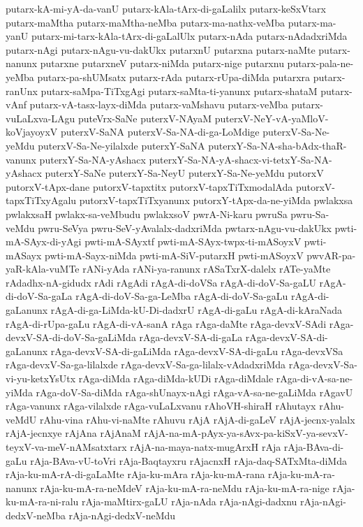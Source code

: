 {putarx-kA-mi-yA-da-vanU
putarx-kAla-tArx-di-gaLalilx
putarx-keSxVtarx
putarx-maMtha
putarx-maMtha-neMba
putarx-ma-nathx-veMba
putarx-ma-yanU
putarx-mi-tarx-kAla-tArx-di-gaLalUlx
putarx-nAda
putarx-nAdadxriMda
putarx-nAgi
putarx-nAgu-vu-dakUkx
putarxnU
putarxna
putarx-naMte
putarx-nanunx
putarxne
putarxneV
putarx-niMda
putarx-nige
putarxnu
putarx-pala-ne-yeMba
putarx-pa-shUMsatx
putarx-rAda
putarx-rUpa-diMda
putarxra
putarx-ranUnx
putarx-saMpa-TiTxgAgi
putarx-saMta-ti-yanunx
putarx-shataM
putarx-vAnf
putarx-vA-tasx-layx-diMda
putarx-vaMshavu
putarx-veMba
putarx-vuLaLxva-LAgu
puteVrx-SaNe
puterxV-NAyaM
puterxV-NeY-vA-yaMloV-koVjayoyxV
puterxV-SaNA
puterxV-Sa-NA-di-ga-LoMdige
puterxV-Sa-Ne-yeMdu
puterxV-Sa-Ne-yilalxde
puterxY-SaNA
puterxY-Sa-NA-sha-bAdx-thaR-vanunx
puterxY-Sa-NA-yAshacx
puterxY-Sa-NA-yA-shacx-vi-tetxY-Sa-NA-yAshacx
puterxY-SaNe
puterxY-Sa-NeyU
puterxY-Sa-Ne-yeMdu
putorxV
putorxV-tApx-dane
putorxV-tapxtitx
putorxV-tapxTiTxmodalAda
putorxV-tapxTiTxyAgalu
putorxV-tapxTiTxyanunx
putorxY-tApx-da-ne-yiMda
pwlakxsa
pwlakxsaH
pwlakx-sa-veMbudu
pwlakxsoV
pwrA-Ni-karu
pwruSa
pwru-Sa-veMdu
pwru-SeVya
pwru-SeV-yAvalalx-dadxriMda
pwtarx-nAgu-vu-dakUkx
pwti-mA-SAyx-di-yAgi
pwti-mA-SAyxtf
pwti-mA-SAyx-twpx-ti-mASoyxV
pwti-mASayx
pwti-mA-Sayx-niMda
pwti-mA-SiV-putarxH
pwti-mASoyxV
pwvAR-pa-yaR-kAla-vuMTe
rANi-yAda
rANi-ya-ranunx
rASaTxrX-dalelx
rATe-yaMte
rAdadhx-nA-gidudx
rAdi
rAgAdi
rAgA-di-doVSa
rAgA-di-doV-Sa-gaLU
rAgA-di-doV-Sa-gaLa
rAgA-di-doV-Sa-ga-LeMba
rAgA-di-doV-Sa-gaLu
rAgA-di-gaLanunx
rAgA-di-ga-LiMda-kU-Di-dadxrU
rAgA-di-gaLu
rAgA-di-kAraNada
rAgA-di-rUpa-gaLu
rAgA-di-vA-sanA
rAga
rAga-daMte
rAga-devxV-SAdi
rAga-devxV-SA-di-doV-Sa-gaLiMda
rAga-devxV-SA-di-gaLa
rAga-devxV-SA-di-gaLanunx
rAga-devxV-SA-di-gaLiMda
rAga-devxV-SA-di-gaLu
rAga-devxVSa
rAga-devxV-Sa-ga-lilalxde
rAga-devxV-Sa-ga-lilalx-vAdadxriMda
rAga-devxV-Sa-vi-yu-ketxYsUtx
rAga-diMda
rAga-diMda-kUDi
rAga-diMdale
rAga-di-vA-sa-ne-yiMda
rAga-doV-Sa-diMda
rAga-shUnayx-nAgi
rAga-vA-sa-ne-gaLiMda
rAgavU
rAga-vanunx
rAga-vilalxde
rAga-vuLaLxvanu
rAhoVH-shiraH
rAhutayx
rAhu-veMdU
rAhu-vina
rAhu-vi-naMte
rAhuvu
rAjA
rAjA-di-gaLeV
rAjA-jecnx-yalalx
rAjA-jecnxye
rAjAna
rAjAnaM
rAjA-na-mA-pAyx-ya-sAvx-pa-kiSxV-ya-sevxV-teyxV-va-meV-nAMsatxtarx
rAjA-na-maya-natx-mugArxH
rAja
rAja-BAva-di-gaLu
rAja-BAva-vU-toVri
rAja-Baqtayxru
rAjacnxH
rAja-daq-SATxMta-diMda
rAja-ku-mA-rA-di-gaLaMte
rAja-ku-mAra
rAja-ku-mA-rana
rAja-ku-mA-ra-nanunx
rAja-ku-mA-ra-neMdeV
rAja-ku-mA-ra-neMdu
rAja-ku-mA-ra-nige
rAja-ku-mA-ra-ni-ralu
rAja-maMtirx-gaLU
rAja-nAda
rAja-nAgi-dadxnu
rAja-nAgi-dedxV-neMba
rAja-nAgi-dedxV-neMdu
}
